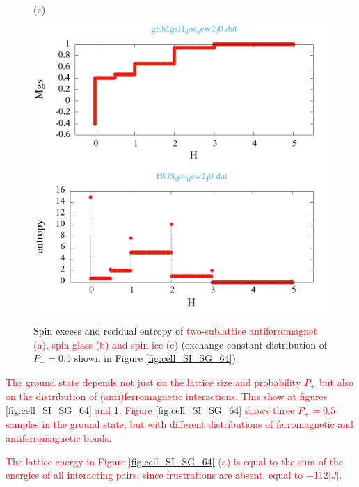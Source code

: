 \documentclass[preprint,12pt]{elsarticle}
\begin{document}
\begin{figure}[H]
\begin{minipage}[h]{0.32\linewidth}
		\end{minipage}
		\hfill
		\begin{minipage}[h]{0.32\linewidth}
			\centering
			\hspace{1cm} (c)
			\includegraphics[width=1\linewidth]{pictures/_multiplot_SI64_J0}
		\end{minipage}
		
		\caption{Spin excess and residual entropy of \textcolor{red}{two-sublattice antiferromagnet (a), spin glass (b) and spin ice (c)} (exchange constant distribution of $P_+ = 0.5$ shown in Figure \ref{fig:cell_SI_SG_64}).}
		\label{fig:_multiplot_SI_SG_64}
		
	\end{figure}
	
	\textcolor{red}{The ground state depends not just on the lattice size and probability $P_+$ but also on the distribution of (anti)ferromagnetic interactions. This show at figures \ref{fig:cell_SI_SG_64} and \ref{fig:_multiplot_SI_SG_64}. Figure \ref{fig:cell_SI_SG_64} shows three $P_+ = 0.5$ samples in the ground state, but with different distributions of ferromagnetic and antiferromagnetic bonds.}
	
	\textcolor{red}{The lattice energy in Figure \ref{fig:cell_SI_SG_64} (a) is equal to the sum of the energies of all interacting pairs, since frustrations are absent, equal to $-112|J|$.}
	
\end{document}
